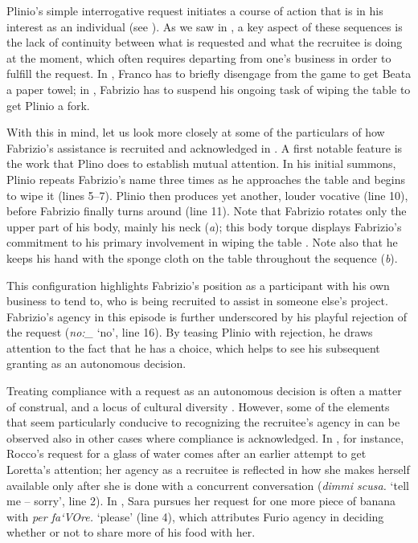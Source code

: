 \documentclass[output=paper,modfonts]{langscibook}
\begin{document}
Plinio's simple interrogative request initiates a course of action that is in his interest as an individual (see ). As we saw in , a key aspect of these sequences is the lack of continuity between what is requested and what the recruitee is doing at the moment, which often requires departing from one's business in order to fulfill the request. In , Franco has to briefly disengage from the game to get Beata a paper towel; in , Fabrizio has to suspend his ongoing task of wiping the table to get Plinio a fork.

With this in mind, let us look more closely at some of the particulars of how Fabrizio's assistance is recruited and acknowledged in . A first notable feature is the work that Plino does to establish mutual attention. In his initial summons, Plinio repeats Fabrizio's name three times as he approaches the table and begins to wipe it (lines 5--7). Plinio then produces yet another, louder vocative (line 10), before Fabrizio finally turns around (line 11). Note that Fabrizio rotates only the upper part of his body, mainly his neck (\textit{a}); this body torque displays Fabrizio's commitment to his primary involvement in wiping the table \citep{Schegloff1998}. Note also that he keeps his hand with the sponge cloth on the table throughout the sequence (\textit{b}). 

This configuration highlights Fabrizio's position as a participant with his own business to tend to, who is being recruited to assist in someone else's project. Fabrizio's agency in this episode is further underscored by his playful rejection of the request (\textit{no:\_} ‘no’, line 16). By teasing Plinio with rejection, he draws attention to the fact that he has a choice, which helps to see his subsequent granting as an autonomous decision.

Treating compliance with a request as an autonomous decision is often a matter of construal, and a locus of cultural diversity \citep{ZinkenRossiReddy}. However, some of the elements that seem particularly conducive to recognizing the recruitee's agency in  can be observed also in other cases where compliance is acknowledged. In , for instance, Rocco's request for a glass of water comes after an earlier attempt to get Loretta's attention; her agency as a recruitee is reflected in how she makes herself available only after she is done with a concurrent conversation (\textit{dimmi scusa.} ‘tell me -- sorry’, line 2). In , Sara pursues her request for one more piece of banana with \textit{per fa`{}VOre.} ‘please’ (line 4), which attributes Furio agency in deciding whether or not to share more of his food with her.
\end{document}
